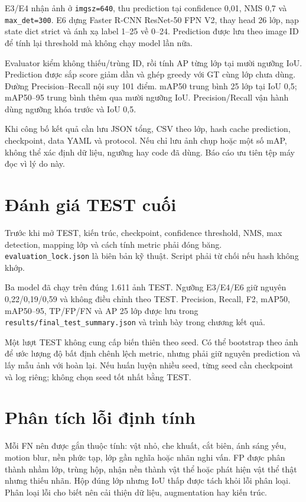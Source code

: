 \documentclass[12pt,a4paper,oneside]{report}
\begin{document}
E3/E4 nhận ảnh ở \texttt{imgsz=640}, thu prediction tại confidence 0,01, NMS 0,7 và \texttt{max\_det=300}. E6 dựng Faster R-CNN ResNet-50 FPN V2, thay head 26 lớp, nạp state dict strict và ánh xạ label 1--25 về 0--24. Prediction được lưu theo image ID để tính lại threshold mà không chạy model lần nữa.

Evaluator kiểm không thiếu/trùng ID, rồi tính AP từng lớp tại mười ngưỡng IoU. Prediction được sắp score giảm dần và ghép greedy với GT cùng lớp chưa dùng. Đường Precision--Recall nội suy 101 điểm. mAP50 trung bình 25 lớp tại IoU 0,5; mAP50--95 trung bình thêm qua mười ngưỡng IoU. Precision/Recall vận hành dùng ngưỡng khóa trước và IoU 0,5.

Khi công bố kết quả cần lưu JSON tổng, CSV theo lớp, hash cache prediction, checkpoint, data YAML và protocol. Nếu chỉ lưu ảnh chụp hoặc một số mAP, không thể xác định dữ liệu, ngưỡng hay code đã dùng. Báo cáo ưu tiên tệp máy đọc vì lý do này.

\section{Đánh giá TEST cuối}
Trước khi mở TEST, kiến trúc, checkpoint, confidence threshold, NMS, max detection, mapping lớp và cách tính metric phải đóng băng. \texttt{evaluation\_lock.json} là biên bản kỹ thuật. Script phải từ chối nếu hash không khớp.

Ba model đã chạy trên đúng 1.611 ảnh TEST. Ngưỡng E3/E4/E6 giữ nguyên 0,22/0,19/0,59 và không điều chỉnh theo TEST. Precision, Recall, F2, mAP50, mAP50--95, TP/FP/FN và AP 25 lớp được lưu trong \texttt{results/final\_test\_summary.json} và trình bày trong chương kết quả.

Một lượt TEST không cung cấp biến thiên theo seed. Có thể bootstrap theo ảnh để ước lượng độ bất định chênh lệch metric, nhưng phải giữ nguyên prediction và lấy mẫu ảnh với hoàn lại. Nếu huấn luyện nhiều seed, từng seed cần checkpoint và log riêng; không chọn seed tốt nhất bằng TEST.

\section{Phân tích lỗi định tính}
Mỗi FN nên được gắn thuộc tính: vật nhỏ, che khuất, cắt biên, ánh sáng yếu, motion blur, nền phức tạp, lớp gần nghĩa hoặc nhãn nghi vấn. FP được phân thành nhầm lớp, trùng hộp, nhận nền thành vật thể hoặc phát hiện vật thể thật nhưng thiếu nhãn. Hộp đúng lớp nhưng IoU thấp được tách khỏi lỗi phân loại. Phân loại lỗi cho biết nên cải thiện dữ liệu, augmentation hay kiến trúc.
\end{document}
